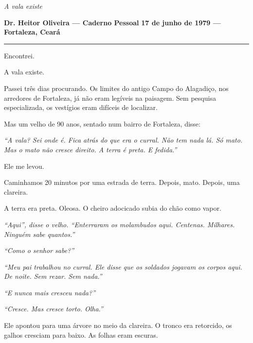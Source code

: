 
\noindent \textit{A vala existe}

\noindent \textbf{Dr. Heitor Oliveira --- Caderno Pessoal}
\textbf{17 de junho de 1979 --- Fortaleza, Ceará}

\vspace{0.5em}\noindent\rule{\textwidth}{0.5pt}\vspace{0.5em}

\noindent Encontrei.

\noindent A vala existe.

\noindent Passei três dias procurando. Os limites do antigo Campo do Alagadiço, nos arredores de Fortaleza, já não eram legíveis na paisagem. Sem pesquisa especializada, os vestígios eram difíceis de localizar.

\noindent Mas um velho de 90 anos, sentado num bairro de Fortaleza, disse:

\noindent \textit{\textquotedblleft{}A vala? Sei onde é. Fica atrás do que era o curral. Não tem nada lá. Só mato. Mas o mato não cresce direito. A terra é preta. E fedida.\textquotedblright{}}

\noindent Ele me levou.

\noindent Caminhamos 20 minutos por uma estrada de terra. Depois, mato. Depois, uma clareira.

\noindent A terra era preta. Oleosa. O cheiro adocicado subia do chão como vapor.

\noindent \textit{\textquotedblleft{}Aqui\textquotedblright{}\textit{, disse o velho. }\textquotedblleft{}Enterraram os molambudos aqui. Centenas. Milhares. Ninguém sabe quantos.\textquotedblright{}}

\noindent \textit{\textquotedblleft{}Como o senhor sabe?\textquotedblright{}}

\noindent \textit{\textquotedblleft{}Meu pai trabalhou no curral. Ele disse que os soldados jogavam os corpos aqui. De noite. Sem rezar. Sem nada.\textquotedblright{}}

\noindent \textit{\textquotedblleft{}E nunca mais cresceu nada?\textquotedblright{}}

\noindent \textit{\textquotedblleft{}Cresce. Mas cresce torto. Olha.\textquotedblright{}}

\noindent Ele apontou para uma árvore no meio da clareira. O tronco era retorcido, os galhos cresciam para baixo. As folhas eram escuras.

